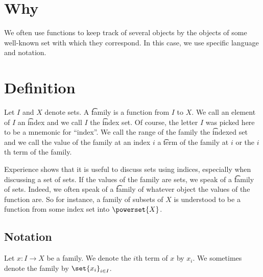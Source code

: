 
\section*{Why}

We often use functions to keep track of several objects by the objects of some well-known set with which they correspond.
In this case, we use specific language and notation.

\section*{Definition}

Let $I$ and $X$ denote sets.
A \t{family} is a function from $I$ to $X$.
We call an element of $I$ an \t{index} and we call $I$ the \t{index set}.
Of course, the letter $I$ was picked here to be a mnemonic for ``index''.
We call the range of the family the \t{indexed set} and we call the value of the family at an index $i$ a \t{term} of the family at $i$ or the \t{$i$th term} of the family.

Experience shows that it is useful to discuss sets using indices, especially when discussing a set of sets.
If the values of the family are sets, we speak of a \t{family of sets}.
Indeed, we often speak of a \t{family of} whatever object the values of the function are.
So for instance, a family of subsets of $X$ is understood to be a function from some index set into $\powerset{X}$.


\subsection*{Notation}

Let $x: I \to X$ be a family.
We denote the $i$th term of $x$ by $x_i$.
We sometimes denote the family by $\set{x_i}_{i \in I}$.

\blankpage